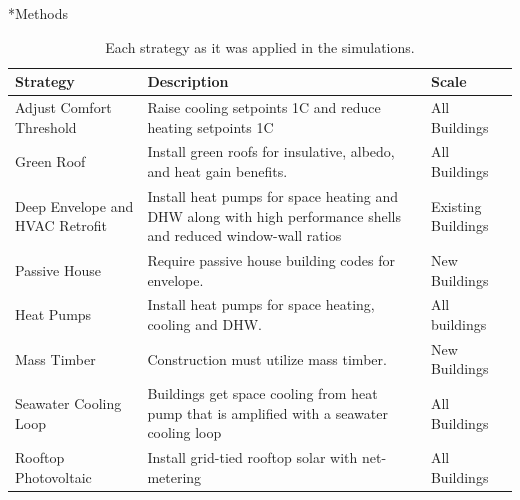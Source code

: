 \documentclass[twocolumn, a4paper,10pt]{article}
\makeatletter
\renewcommand\section{\@startsection{section}{1}{\z@}{3pt}{3pt}{\normalfont\large\bfseries}}
\makeatother
\begin{document}
\section*{Methods}

\begin{table}[ht]
    \vspace{-5pt}   %
    \caption{Each strategy as it was applied in the simulations.}
    \footnotesize
    \label{tab:strategies}
    \centering
    \begin{tabularx}{\linewidth}{|>{\hsize=0.2\hsize}X|
                              >{\hsize=0.5\hsize}X|
                              >{\hsize=0.3\hsize}X|}
        \hline
        \bf{Strategy} & \bf{Description} & \bf{Scale} \\
        \hline
        Adjust Comfort Threshold & Raise cooling setpoints 1C and reduce heating setpoints 1C & All Buildings \\
        \hline
        Green Roof & Install green roofs for insulative, albedo, and heat gain benefits. & All Buildings \\
        \hline
        Deep Envelope and HVAC Retrofit & Install heat pumps for space heating and DHW along with high performance shells and reduced window-wall ratios & Existing Buildings \\
        \hline
        Passive House & Require passive house building codes for envelope. & New Buildings \\
        \hline
        Heat Pumps & Install heat pumps for space heating, cooling and DHW. & All buildings \\
        \hline
        Mass Timber & Construction must utilize mass timber. & New Buildings \\
        \hline
        Seawater Cooling Loop & Buildings get space cooling from heat pump that is amplified with a seawater cooling loop & All Buildings \\
        \hline
        Rooftop Photovoltaic & Install grid-tied rooftop solar with net-metering & All Buildings \\
        \hline
    \end{tabularx}
    \vspace{-5pt}   %
\end{table}
\end{document}
